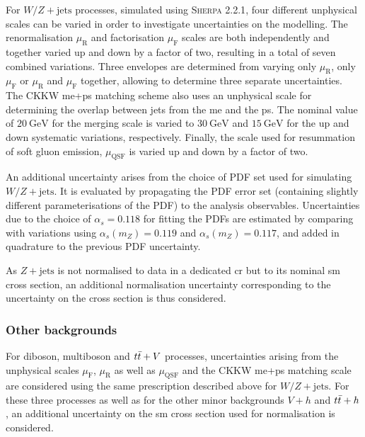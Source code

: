  For $W/Z+\mathrm{jets}$ processes, simulated using \textsc{Sherpa 2.2.1}, four different unphysical scales can be varied in order to investigate uncertainties on the modelling. The renormalisation $\mu_\mathrm{R}$ and factorisation $\mu_\mathrm{F}$ scales are both independently and together varied up and down by a factor of two, resulting in a total of seven combined variations. Three envelopes are determined from varying only $\mu_\mathrm{R}$, only $\mu_\mathrm{F}$ or $\mu_\mathrm{R}$ and $\mu_\mathrm{F}$ together, allowing to determine three separate uncertainties. The CKKW \gls{me}+\gls{ps} matching scheme also uses an unphysical scale for determining the overlap between jets from the \gls{me} and the \gls{ps}. The nominal value of $\SI{20}{\GeV}$ for the merging scale is varied to $\SI{30}{\GeV}$ and $\SI{15}{\GeV}$ for the up and down systematic variations, respectively. Finally, the scale used for resummation of soft gluon emission, $\mu_\mathrm{QSF}$ is varied up and down by a factor of two.
 
 An additional uncertainty arises from the choice of \gls{PDF} set used for simulating $W/Z+\mathrm{jets}$. It is evaluated by propagating the \gls{PDF} error set (containing slightly different parameterisations of the \gls{PDF}) to the analysis observables. Uncertainties due to the choice of $\alpha_s = 0.118$ for fitting the \glspl{PDF} are estimated by comparing with variations using $\alpha_s(m_Z) = 0.119$ and $\alpha_s(m_Z) = 0.117$, and added in quadrature to the previous \gls{PDF} uncertainty.
 
 As $Z+\mathrm{jets}$ is not normalised to data in a dedicated \gls{cr} but to its nominal \gls{sm} cross section, an additional normalisation uncertainty corresponding to the uncertainty on the cross section is thus considered.
  
 \subsubsection{Other backgrounds}
 
 For diboson, multiboson and $t\bar{t}+V$ processes, uncertainties arising from the unphysical scales $\mu_\mathrm{F}$, $\mu_\mathrm{R}$ as well as $\mu_\mathrm{QSF}$ and the CKKW \gls{me}+\gls{ps} matching scale are considered using the same prescription described above for $W/Z+\mathrm{jets}$. For these three processes as well as for the other minor backgrounds $V+h$ and $t\bar{t}+h$, an additional uncertainty on the \gls{sm} cross section used for normalisation is considered.
  
